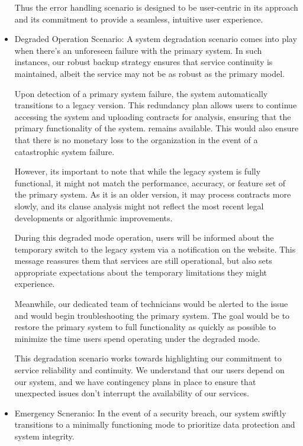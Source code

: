 \begin{itemize}
Thus the error handling scenario is designed to be user-centric in its approach and its commitment to provide a seamless, intuitive user experience. 

 \item Degraded Operation Scenario: A system degradation scenario comes into play when there's an unforeseen failure with the primary system. In such instances, our robust backup strategy ensures that service continuity is maintained, albeit the service may not be as robust as the primary model.

Upon detection of a primary system failure, the system automatically transitions to a legacy version. This redundancy plan allows users to continue accessing the system and uploading contracts for analysis, ensuring that the primary functionality of the system. remains available. This would also ensure that there is no monetary loss to the organization in the event of a catastrophic system failure. 

However, its important to note that while the legacy system is fully functional, it might not match the performance, accuracy, or feature set of the primary system. As it is an older version, it may process contracts more slowly, and its clause analysis might not reflect the most recent legal developments or algorithmic improvements.

During this degraded mode operation, users will be informed about the temporary switch to the legacy system via a notification on the website. This message reassures them that services are still operational, but also sets appropriate expectations about the temporary limitations they might experience.

Meanwhile, our dedicated team of technicians would be alerted to the issue and would begin troubleshooting the primary system. The goal would be to restore the primary system to full functionality as quickly as possible to minimize the time users spend operating under the degraded mode.

This degradation scenario works towards highlighting our commitment to service reliability and continuity. We understand that our users depend on our system, and we have contingency plans in place to ensure that unexpected issues don't interrupt the availability of our services.

    \item Emergency Scneranio: In the event of a security breach, our system swiftly transitions to a minimally functioning mode to prioritize data protection and system integrity.


\end{itemize}
